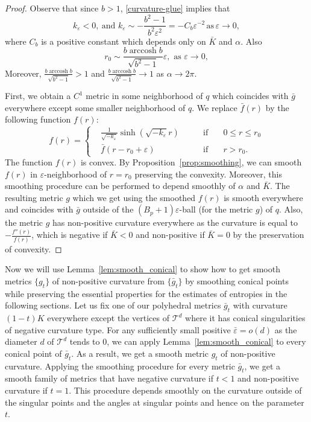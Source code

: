 \documentclass[12pt]{article}
\numberwithin{equation}{section}
\theoremstyle{definition}
\newcommand{\eps}{\varepsilon}
\DeclareMathOperator{\arccosh}{arccosh}
\begin{document}
\begin{proof}
Observe that since $b>1$, \eqref{curvature-glue} implies that  
$$k_\eps<0,\ \text{and}\, \,k_\eps\sim -\frac{b^2-1}{b^2\eps^2} = -C_b\eps^{-2}\,\text{as} \,\eps\to 0,$$ 
where $C_b$ is a positive constant which depends only on $\bar K$ and $\alpha$. Also
$$r_0\sim \frac{b\arccosh b}{\sqrt{b^2-1}}\eps, \,\, \text{as}\,\, \eps\to 0,$$ 
 Moreover, $ \frac{b\arccosh b}{\sqrt{b^2-1}}>1$ and  $\frac{b\arccosh b}{\sqrt{b^2-1}} \to1$ as $\alpha\to 2\pi$.

First, we obtain a $C^1$ metric in some neighborhood of  $q$ which coincides with $\bar g$ everywhere except some smaller neighborhood of  $q$. We replace $\bar f(r)$ by the following function $f(r)$:
\begin{equation}
f(r) = \left\{\begin{aligned}&\frac{1}{\sqrt{-k_\eps}}\sinh(\sqrt{-k_\eps}r) \qquad &\text{if} \quad &0\leqslant r\leqslant r_0\\
&\bar f(r-r_0+\eps)\qquad &\text{if} \quad &r> r_0.
\end{aligned}\right.
\end{equation}
The function $f(r)$ is convex. By Proposition~\ref{prop:smoothing}, we can smooth $f(r)$ in $\eps$-neighborhood of $r=r_0$ preserving the convexity. Moreover, this smoothing procedure can be performed to depend smoothly of $\alpha$ and $\bar K$. The resulting metric $g$ which we get using the smoothed $f(r)$ is smooth everywhere and coincides with $\bar g$ outside of the $(B_p+1)\eps$-ball (for the metric $g$) of $q$. Also, the metric $g$ has non-positive curvature everywhere as the curvature is equal to $-\frac{f''(r)}{f(r)}$, which is negative if $\bar K<0$ and non-positive if $\bar K=0$ by the preservation of convexity.
\end{proof}
 
Now we will use Lemma~\ref{lem:smooth_conical} to show how to get smooth metrics $\{g_t\}$ of non-positive curvature from $\{\bar g_t\}$ by smoothing conical points while preserving the essential properties for the estimates of entropies in the following sections. Let us fix one of our polyhedral metrics $\bar g_t$ with curvature $(1-t)K$ everywhere except the vertices of $\mathcal T^d$ where it has conical singularities of negative curvature type. For any sufficiently small positive $\bar \eps = o(d)$ as the diameter $d$ of $\mathcal T^d$ tends to $0$, we can apply Lemma~\ref{lem:smooth_conical} to every conical point of $\bar g_t$. As a result, we get a smooth metric $g_t$ of non-positive curvature. Applying the smoothing procedure for every metric $\bar g_t$, we get a smooth family  of metrics  that have  negative curvature if $t<1$ and non-positive curvature if $t=1$.   This  procedure depends smoothly on the curvature outside of the singular points and the angles at singular points and hence on the parameter $t$. 
\end{document}
